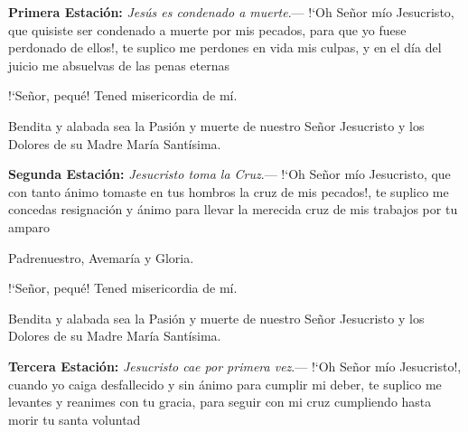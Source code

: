 \textbf{Primera Estación:} \textit{Jesús es condenado a muerte}.--- {!`}Oh Señor mío Jesucristo, que quisiste ser condenado a muerte por mis pecados, 
para que yo fuese perdonado de ellos!, te suplico me perdones en vida mis culpas, y en el día del juicio me absuelvas de las penas eternas

\vspace{2mm}

\begin{otherlanguage}{latin}
      

      \vspace{1mm}

      

      \vspace{1mm}

      
\end{otherlanguage}

\vspace{1mm}

{!`}Señor, pequé! Tened misericordia de mí.

Bendita y alabada sea la Pasión y muerte de nuestro Señor Jesucristo y los Dolores de su Madre María Santísima.

\vspace{2mm}

\textbf{Segunda Estación:} \textit{Jesucristo toma la Cruz}.--- {!`}Oh Señor mío Jesucristo, que con tanto ánimo tomaste en tus hombros la cruz de mis pecados!, 
te suplico me concedas resignación y ánimo para llevar la merecida cruz de mis trabajos por tu amparo

\vspace{2mm}

Padrenuestro, Avemaría y Gloria.

{!`}Señor, pequé! Tened misericordia de mí.

Bendita y alabada sea la Pasión y muerte de nuestro Señor Jesucristo y los Dolores de su Madre María Santísima.

\vspace{2mm}

\textbf{Tercera Estación:} \textit{Jesucristo cae por primera vez}.--- {!`}Oh Señor mío Jesucristo!, cuando yo caiga desfallecido y sin ánimo para cumplir mi deber,
te suplico me levantes y reanimes con tu gracia, para seguir con mi cruz cumpliendo hasta morir tu santa voluntad

\vspace{2mm}

